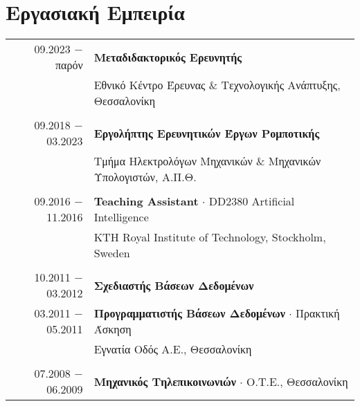 \documentclass[a4paper,10pt,twoside]{article}
\begin{document}


\par{\bigskip\par}


\section{Εργασιακή Εμπειρία}

\begin{tabular}{rp{12cm}}
09.2023  $-$ \hfill παρόν \hfill  & \textbf{Μεταδιδακτορικός Ερευνητής} \\
                    & Εθνικό Κέντρο Έρευνας \& Τεχνολογικής Ανάπτυξης, Θεσσαλονίκη \\
&\\
09.2018 $-$ 03.2023 & \textbf{Εργολήπτης Ερευνητικών Έργων Ρομποτικής} \\
                    & Τμήμα Ηλεκτρολόγων Μηχανικών \& Μηχανικών Υπολογιστών, Α.Π.Θ.\\
&\\
09.2016 $-$ 11.2016 & \textbf{Teaching Assistant} $\cdot$ DD2380 Artificial Intelligence \\ & KTH Royal Institute of Technology, Stockholm, Sweden\\
&\\
10.2011 $-$ 03.2012 & \textbf{Σχεδιαστής Βάσεων Δεδομένων} \\
03.2011 $-$ 05.2011 & \textbf{Προγραμματιστής Βάσεων Δεδομένων} $\cdot$ Πρακτική Άσκηση \\ & Εγνατία Οδός Α.Ε., Θεσσαλονίκη \\
&\\
07.2008 $-$ 06.2009 & \textbf{Μηχανικός Τηλεπικοινωνιών} $\cdot$ Ο.Τ.Ε., Θεσσαλονίκη\\
\end{tabular} \\
\end{document}
